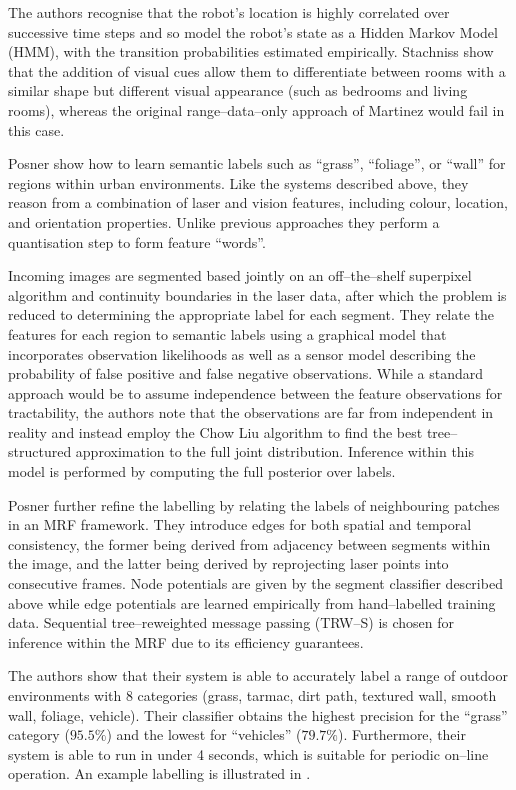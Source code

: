 The authors recognise that the robot's location is highly correlated
over successive time steps and so model the robot's state as a Hidden
Markov Model (HMM), with the transition probabilities estimated
empirically. Stachniss \etal show that the addition of visual cues
allow them to differentiate between rooms with a similar shape but
different visual appearance (such as bedrooms and living rooms),
whereas the original range--data--only approach of Martinez would fail
in this case.

Posner \etal \cite{Posner08} show how to learn semantic labels such as
``grass'', ``foliage'', or ``wall'' for regions within urban
environments. Like the systems described above, they reason from a
combination of laser and vision features, including colour, location,
and orientation properties. Unlike previous approaches they perform a
quantisation step to form feature ``words''.

Incoming images are segmented based jointly on an off--the--shelf
superpixel algorithm and continuity boundaries in the laser data,
after which the problem is reduced to determining the appropriate
label for each segment. They relate the features for each region to
semantic labels using a graphical model that incorporates observation
likelihoods as well as a sensor model describing the probability of
false positive and false negative observations. While a standard
approach would be to assume independence between the feature
observations for tractability, the authors note that the observations
are far from independent in reality and instead employ the Chow Liu
algorithm to find the best tree--structured approximation to the full
joint distribution. Inference within this model is performed by
computing the full posterior over labels.

Posner \etal further refine the labelling by relating the labels of
neighbouring patches in an MRF framework. They introduce edges for
both spatial and temporal consistency, the former being derived from
adjacency between segments within the image, and the latter being
derived by reprojecting laser points into consecutive frames. Node
potentials are given by the segment classifier described above
while edge potentials are learned empirically from hand--labelled
training data. Sequential tree--reweighted message passing (TRW--S) is
chosen for inference within the MRF due to its efficiency guarantees.

The authors show that their system is able to accurately label a range
of outdoor environments with 8 categories (grass, tarmac, dirt path,
textured wall, smooth wall, foliage, vehicle). Their classifier
obtains the highest precision for the ``grass'' category ($95.5\%$)
and the lowest for ``vehicles'' ($79.7\%$). Furthermore, their system
is able to run in under 4 seconds, which is suitable for periodic
on--line operation. An example labelling is illustrated in
.

